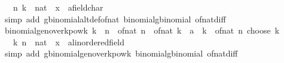 \begin{isabellebody}
\ \ \ n\ k\ {\isacharcolon}{\kern0pt}{\isacharcolon}{\kern0pt}\ nat\ \ x\ {\isacharcolon}{\kern0pt}{\isacharcolon}{\kern0pt}\ {\isachardoublequoteopen}{\isacharprime}{\kern0pt}a{\isacharcolon}{\kern0pt}{\isacharcolon}{\kern0pt}field{\isacharunderscore}{\kern0pt}char{\isacharunderscore}{\kern0pt}{}{\isachardoublequoteclose}\isanewline
%
\isadelimproof
\ \ %
\endisadelimproof
%
\isatagproof
{}\isamarkupfalse%
\ {\isacharparenleft}{\kern0pt}simp\ add{\isacharcolon}{\kern0pt}\ gbinomial{\isacharunderscore}{\kern0pt}altdef{\isacharunderscore}{\kern0pt}of{\isacharunderscore}{\kern0pt}nat\ binomial{\isacharunderscore}{\kern0pt}gbinomial\ of{\isacharunderscore}{\kern0pt}nat{\isacharunderscore}{\kern0pt}diff{\isacharparenright}{\kern0pt}%
\endisatagproof
{\isafoldproof}%
%
\isadelimproof
\isanewline
%
\endisadelimproof
\isanewline
{}\isamarkupfalse%
\ binomial{\isacharunderscore}{\kern0pt}ge{\isacharunderscore}{\kern0pt}n{\isacharunderscore}{\kern0pt}over{\isacharunderscore}{\kern0pt}k{\isacharunderscore}{\kern0pt}pow{\isacharunderscore}{\kern0pt}k{\isacharcolon}{\kern0pt}\ {\isachardoublequoteopen}k\ {\isasymle}\ n\ {\isasymLongrightarrow}\ {\isacharparenleft}{\kern0pt}of{\isacharunderscore}{\kern0pt}nat\ n\ {\isacharslash}{\kern0pt}\ of{\isacharunderscore}{\kern0pt}nat\ k\ {\isacharcolon}{\kern0pt}{\isacharcolon}{\kern0pt}\ {\isacharprime}{\kern0pt}a{\isacharparenright}{\kern0pt}\ {\isacharcircum}{\kern0pt}\ k\ {\isasymle}\ of{\isacharunderscore}{\kern0pt}nat\ {\isacharparenleft}{\kern0pt}n\ choose\ k{\isacharparenright}{\kern0pt}{\isachardoublequoteclose}\isanewline
\ \ \ k\ n\ {\isacharcolon}{\kern0pt}{\isacharcolon}{\kern0pt}\ nat\ \ x\ {\isacharcolon}{\kern0pt}{\isacharcolon}{\kern0pt}\ {\isachardoublequoteopen}{\isacharprime}{\kern0pt}a{\isacharcolon}{\kern0pt}{\isacharcolon}{\kern0pt}linordered{\isacharunderscore}{\kern0pt}field{\isachardoublequoteclose}\isanewline
%
\isadelimproof
\ \ %
\endisadelimproof
%
\isatagproof
{}\isamarkupfalse%
\ {\isacharparenleft}{\kern0pt}simp\ add{\isacharcolon}{\kern0pt}\ gbinomial{\isacharunderscore}{\kern0pt}ge{\isacharunderscore}{\kern0pt}n{\isacharunderscore}{\kern0pt}over{\isacharunderscore}{\kern0pt}k{\isacharunderscore}{\kern0pt}pow{\isacharunderscore}{\kern0pt}k\ binomial{\isacharunderscore}{\kern0pt}gbinomial\ of{\isacharunderscore}{\kern0pt}nat{\isacharunderscore}{\kern0pt}diff{\isacharparenright}{\kern0pt}%
\endisatagproof
{\isafoldproof}%
%
\isadelimproof
\isanewline
%
\endisadelimproof
\isanewline

\end{isabellebody}
